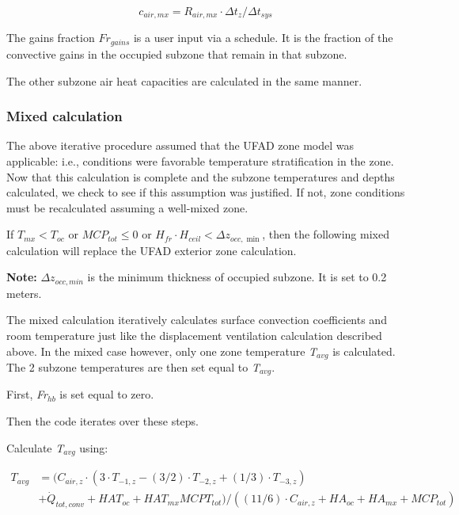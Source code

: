 {\begin{equation}
{c_{air,mx}} = {R_{air,mx}} \cdot \Delta {t_z}/\Delta {t_{sys}}
\end{equation}

The gains fraction \(F{r_{gains}}\) is a user input via a schedule. It is the fraction of the convective gains in the occupied subzone that remain in that subzone.

The other subzone air heat capacities are calculated in the same manner.

\subsubsection{Mixed calculation}\label{mixed-calculation-2}

The above iterative procedure assumed that the UFAD zone model was applicable: i.e., conditions were favorable temperature stratification in the zone. Now that this calculation is complete and the subzone temperatures and depths calculated, we check to see if this assumption was justified. If not, zone conditions must be recalculated assuming a well-mixed zone.

If \({T_{mx}} < {T_{oc}}\) or \(MC{P_{tot}} \le 0\) or \({H_{fr}} \cdot {H_{ceil}} < \Delta {z_{occ,\min }}\), then the following mixed calculation will replace the UFAD exterior zone calculation.

\textbf{Note:} \(\Delta {z_{occ,min}}\) is the minimum thickness of occupied subzone. It is set to 0.2 meters.

The mixed calculation iteratively calculates surface convection coefficients and room temperature just like the displacement ventilation calculation described above. In the mixed case however, only one zone temperature \emph{T\(_{avg}\)} is calculated. The 2 subzone temperatures are then set equal to \emph{T\(_{avg}\)}.

First, \emph{Fr\(_{hb}\)} is set equal to zero.

Then the code iterates over these steps.

Calculate \emph{T\(_{avg}\)} using:

\begin{equation}
  \begin{array}{rl}
    T_{avg} &= ({C_{air,z}} \cdot (3 \cdot {T_{ - 1,z}} - (3/2) \cdot {T_{ - 2,z}} + (1/3) \cdot {T_{ - 3,z}}) \\
            &+ {{\dot Q}_{tot,conv}} + HA{T_{oc}} + HA{T_{mx}}MCP{T_{tot}})/((11/6) \cdot {C_{air,z}} + H{A_{oc}} + H{A_{mx}} + MC{P_{tot}})
  \end{array}
\end{equation}

}

